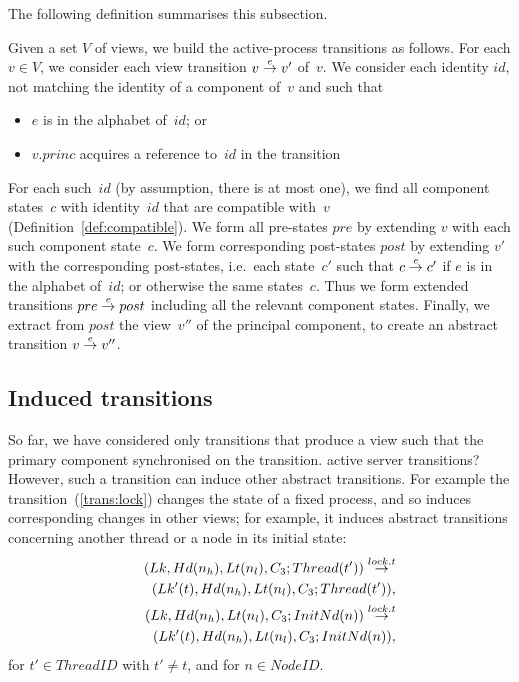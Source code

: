 The following definition summarises this subsection.
%
\begin{definition}
\label{def:active-process-transition}
Given a set $V$ of views, we build the active-process transitions as follows.
For each $v \in V$, we consider each view transition $v \stackrel{e}\rightarrow v'$ of~$v$.
We consider each identity $id$, not matching the identity of a component
of~$v$ and such that
%
\begin{itemize}
\item $e$ is in the alphabet of~$id$; or

\item $v.princ$ acquires a reference to~$id$ in the transition
\end{itemize}
%
For each such~$id$ (by assumption, there is at most one), we find all
component states~$c$ with identity~$id$ that are compatible with~$v$
(Definition~\ref{def:compatible}).  We form all pre-states $pre$ by extending
$v$ with each such component state~$c$.  We form corresponding post-states
$post$ by extending $v'$ with the corresponding post-states, i.e.\ each
state~$c'$ such that $c \stackrel{e}\rightarrow c'$ if $e$ is in the alphabet of~$id$; or
otherwise the same states~$c$.  Thus we form extended transitions $pre
\stackrel{e}\rightarrow post$ including all the relevant component states.  Finally, we
extract from $post$ the view~$v''$ of the principal component, to create an
abstract transition $v \stackrel{e}\rightarrow v''$.
\end{definition}


\subsection{Induced transitions}

So far, we have considered only transitions that produce a view such that the
primary component synchronised on the transition.   active server
transitions?  However, such a transition can induce other abstract
transitions.  For example the transition~(\ref{trans:lock}) changes the state
of a fixed process, and so induces corresponding changes in other views; for
example, it induces abstract transitions concerning another thread or a node
in its initial state:
%
\[
\begin{align}
(Lk, Hd(n_h), Lt(n_l), C_3; Thread(t'))  \stackrel{lock.t}\rightarrow \\
\qquad  (Lk'(t), Hd(n_h), Lt(n_l), C_3; Thread(t')), \\
(Lk,  Hd(n_h), Lt(n_l), C_3; InitNd(n))  \stackrel{lock.t}\rightarrow \\
\qquad  (Lk'(t),  Hd(n_h), Lt(n_l), C_3; InitNd(n)),
\end{align}
\]
%
for $t' \in ThreadID$ with $t' \ne t$, and for $n \in NodeID$.

